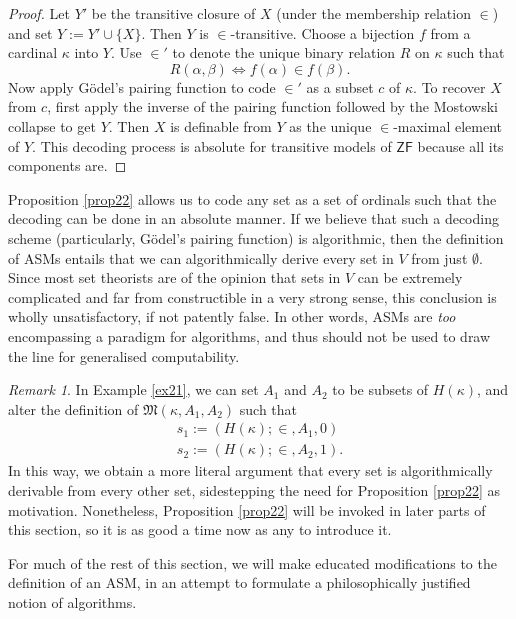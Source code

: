 \documentclass[12pt, twoside]{memoir}
\numberwithin{equation}{section}
\theoremstyle{definition}
\theoremstyle{remark}
\newtheorem{rem}[thm]{Remark}
\theoremstyle{definition}
\theoremstyle{definition}
\theoremstyle{definition}
\theoremstyle{remark}
\begin{document}
\begin{proof}
Let $Y'$ be the transitive closure of $X$ (under the membership relation $\in$) and set $Y := Y' \cup \{X\}$. Then $Y$ is $\in$-transitive. Choose a bijection $f$ from a cardinal $\kappa$ into $Y$. Use $\in'$ to denote the unique binary relation $R$ on $\kappa$ such that
\begin{equation*}
    R(\alpha, \beta) \iff f(\alpha) \in f(\beta) \text{.}
\end{equation*}
Now apply G\"{o}del's pairing function to code $\in'$ as a subset $c$ of $\kappa$. To recover $X$ from $c$, first apply the inverse of the pairing function followed by the Mostowski collapse to get $Y$. Then $X$ is definable from $Y$ as the unique $\in$-maximal element of $Y$. This decoding process is absolute for transitive models of $\mathsf{ZF}$ because all its components are.
\end{proof}

Proposition \ref{prop22} allows us to code any set as a set of ordinals such that the decoding can be done in an absolute manner. If we believe that such a decoding scheme (particularly, G\"{o}del's pairing function) is algorithmic, then the definition of ASMs entails that we can algorithmically derive every set in $V$ from just $\emptyset$. Since most set theorists are of the opinion that sets in $V$ can be extremely complicated and far from constructible in a very strong sense, this conclusion is wholly unsatisfactory, if not patently false. In other words, ASMs are \emph{too} encompassing a paradigm for algorithms, and thus should not be used to draw the line for generalised computability.

\begin{rem}
In Example \ref{ex21}, we can set $A_1$ and $A_2$ to be subsets of $H(\kappa)$, and alter the definition of $\mathfrak{M}(\kappa, A_1, A_2)$ such that 
\begin{gather*}
    s_1 := (H(\kappa); \in, A_1, 0) \\
    s_2 := (H(\kappa); \in, A_2, 1) \text{.}
\end{gather*}
In this way, we obtain a more literal argument that every set is algorithmically derivable from every other set, sidestepping the need for Proposition \ref{prop22} as motivation. Nonetheless, Proposition \ref{prop22} will be invoked in later parts of this section, so it is as good a time now as any to introduce it.
\end{rem}

For much of the rest of this section, we will make educated modifications to the definition of an ASM, in an attempt to formulate a philosophically justified notion of algorithms.
\end{document}
